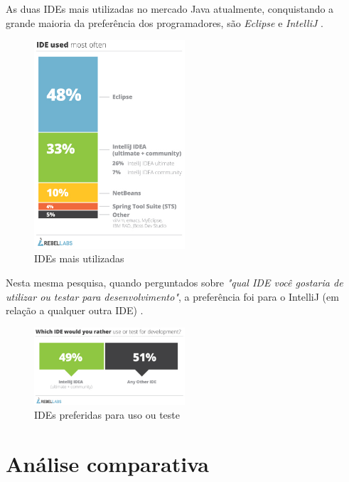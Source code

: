 \documentclass[12pt,journal,compsoc]{IEEEtran}
\begin{document}
As duas IDEs mais utilizadas no mercado Java atualmente, conquistando a grande maioria da preferência dos programadores, são \emph{Eclipse} e \emph{IntelliJ} \cite{zero_turnaround}.

\begin{figure}[ht!]
\centering
\includegraphics[width=0.5\textwidth]{img/ide-used-most-often-graph}
\caption{IDEs mais utilizadas \cite{zero_turnaround}}
\label{flow_before}
\end{figure}

Nesta mesma pesquisa, quando perguntados sobre \emph{"qual IDE você gostaria de utilizar ou testar para desenvolvimento"}, a preferência foi para o IntelliJ (em relação a qualquer outra IDE) \cite{zero_turnaround}.

\begin{figure}[ht!]
\centering
\includegraphics[width=0.5\textwidth]{img/which-ide-would-you-rather-use-or-test-for-development-graph}
\caption{IDEs preferidas para uso ou teste \cite{zero_turnaround}}
\label{flow_before}
\end{figure}


\section{Análise comparativa}
\end{document}
